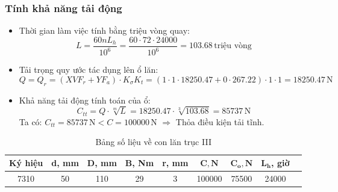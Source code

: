             \subsubsection{Tính khả năng tải động}
                \begin{itemize}
                    \item Thời gian làm việc tính bằng triệu vòng quay:
                        \[
                            L = \frac{60nL_{h}}{10^6} = \frac{60 \cdot 72 \cdot 24000}{10^6} = 103.68\, \textrm{triệu vòng} 
                        \]
                    \item Tải trọng quy ước tác dụng lên ổ lăn:
                        \[
                            Q = Q_{r} = (XVF_{r} + YF_{a}) \cdot K_{\sigma}K_{t} = (1 \cdot 1 \cdot 18250.47 + 0 \cdot 267.22) \cdot 1 \cdot 1 = 18250.47\, \mathrm{N}
                        \]
                    \item Khả năng tải động tính toán của ổ:
                        \[
                            C_{tt} = Q \cdot \sqrt[m]{L} = 18250.47 \cdot \sqrt[3]{103.68} = 85737 \, \mathrm{N}
                        \]
                        Ta có:  $C_{tt} = 85737\, \mathrm{N} < C = 100000\, \mathrm{N}$ $\Rightarrow$ Thỏa điều kiện tải tĩnh. 
                \end{itemize} 
                \begin{table}[H]
                    \centering
                    \begin{tabular}{|c|c|c|c|c|c|c|c|c|}
                        \hline
                        \textbf{Ký hiệu} & \textbf{d, mm} & \textbf{D, mm} & \textbf{B, Nm} & \textbf{r, mm} & $\mathbf{C, N}$ & $\mathbf{C_{o}, N}$ & $\mathbf{L_{h}}$, \textbf{giờ} \\
                        \hline
                        7310 & 50 & 110 & 29 & 3 & 100000 & 75500 & 24000 \\
                        \hline
                    \end{tabular}
                    \caption{Bảng số liệu về con lăn trục III}
                \end{table}

                    
                
            